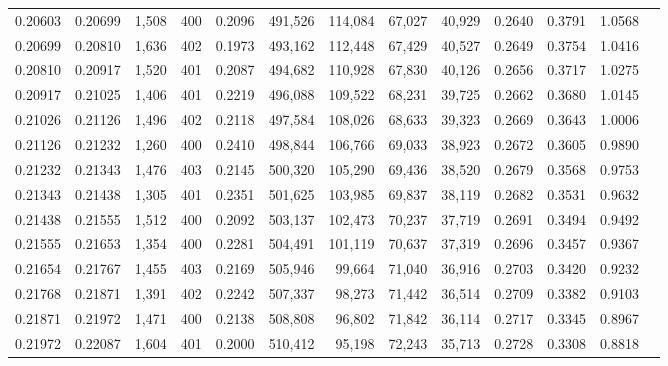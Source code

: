 \begin{tabular}{rrrrrrrrrrrrr}
0.20603 & 0.20699 &  1,508 & 400 &                                     0.2096 & 491,526 & 114,084 &  67,027 &  40,929 & 0.2640 & 0.3791 & 1.0568 \\
0.20699 & 0.20810 &  1,636 & 402 &                                     0.1973 & 493,162 & 112,448 &  67,429 &  40,527 & 0.2649 & 0.3754 & 1.0416 \\
0.20810 & 0.20917 &  1,520 & 401 &                                     0.2087 & 494,682 & 110,928 &  67,830 &  40,126 & 0.2656 & 0.3717 & 1.0275 \\
0.20917 & 0.21025 &  1,406 & 401 &                                     0.2219 & 496,088 & 109,522 &  68,231 &  39,725 & 0.2662 & 0.3680 & 1.0145 \\
0.21026 & 0.21126 &  1,496 & 402 &                                     0.2118 & 497,584 & 108,026 &  68,633 &  39,323 & 0.2669 & 0.3643 & 1.0006 \\
0.21126 & 0.21232 &  1,260 & 400 &                                     0.2410 & 498,844 & 106,766 &  69,033 &  38,923 & 0.2672 & 0.3605 & 0.9890 \\
0.21232 & 0.21343 &  1,476 & 403 &                                     0.2145 & 500,320 & 105,290 &  69,436 &  38,520 & 0.2679 & 0.3568 & 0.9753 \\
0.21343 & 0.21438 &  1,305 & 401 &                                     0.2351 & 501,625 & 103,985 &  69,837 &  38,119 & 0.2682 & 0.3531 & 0.9632 \\
0.21438 & 0.21555 &  1,512 & 400 &                                     0.2092 & 503,137 & 102,473 &  70,237 &  37,719 & 0.2691 & 0.3494 & 0.9492 \\
0.21555 & 0.21653 &  1,354 & 400 &                                     0.2281 & 504,491 & 101,119 &  70,637 &  37,319 & 0.2696 & 0.3457 & 0.9367 \\
0.21654 & 0.21767 &  1,455 & 403 &                                     0.2169 & 505,946 &  99,664 &  71,040 &  36,916 & 0.2703 & 0.3420 & 0.9232 \\
0.21768 & 0.21871 &  1,391 & 402 &                                     0.2242 & 507,337 &  98,273 &  71,442 &  36,514 & 0.2709 & 0.3382 & 0.9103 \\
0.21871 & 0.21972 &  1,471 & 400 &                                     0.2138 & 508,808 &  96,802 &  71,842 &  36,114 & 0.2717 & 0.3345 & 0.8967 \\
0.21972 & 0.22087 &  1,604 & 401 &                                     0.2000 & 510,412 &  95,198 &  72,243 &  35,713 & 0.2728 & 0.3308 & 0.8818 \\

\end{tabular}
